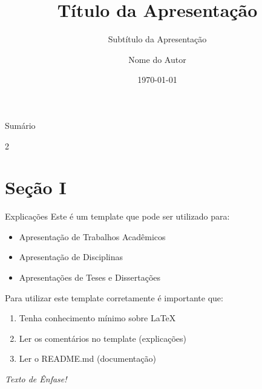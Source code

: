 \documentclass{libs/ufc_format}
\title[short title]{\huge\textbf{Título da Apresentação}}
\subtitle{Subtítulo da Apresentação}
\author{Nome do Autor}
\institute[UFSC]{
    \normalsize{\email{usuario@dominio}}
    \newline
    \department{Programa de Pós-Graduação em Engenharia Mecânica}
    \newline
    \ufsc
}
\date{\today}
\begin{document}


\begin{frame}{}
    \maketitle
\end{frame}

\begin{frame}{Sumário}
    \begin{multicols}{2}
        \tableofcontents
    \end{multicols}
\end{frame}

\section{Seção I}
\begin{frame}{Explicações}
    Este é um template que pode ser utilizado para:
    \begin{itemize}
        \item Apresentação de Trabalhos Acadêmicos
        \item Apresentação de Disciplinas
        \item Apresentações de Teses e Dissertações
    \end{itemize}

    \vspace{0.4cm} %
    
    Para utilizar este template corretamente é importante que:
    \begin{enumerate}
        \item Tenha conhecimento mínimo sobre LaTeX
        \item Ler os comentários no template (explicações)
        \item Ler o README.md (documentação)
    \end{enumerate}

    \vspace{0.2cm}

     \emph{Texto de Ênfase!}
\end{frame}
\end{document}
